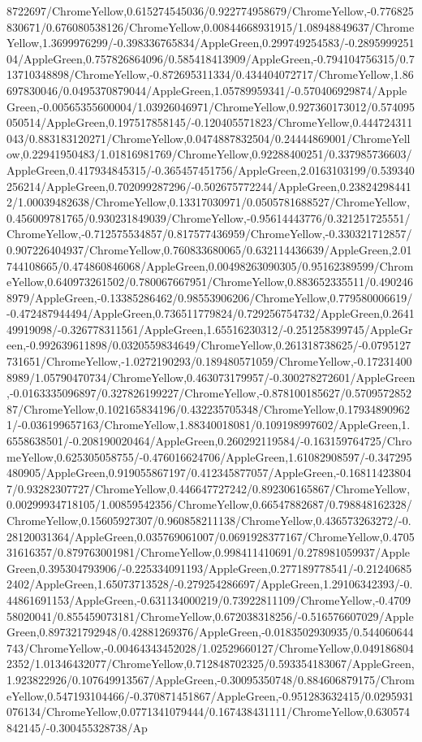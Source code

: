 {\begin{tikzternal}
8722697/ChromeYellow,0.615274545036/0.922774958679/ChromeYellow,-0.776825830671/0.676080538126/ChromeYellow,0.00844668931915/1.08948849637/ChromeYellow,1.3699976299/-0.398336765834/AppleGreen,0.299749254583/-0.289599925104/AppleGreen,0.757826864096/0.585418413909/AppleGreen,-0.794104756315/0.713710348898/ChromeYellow,-0.872695311334/0.434404072717/ChromeYellow,1.86697830046/0.0495370879044/AppleGreen,1.05789959341/-0.570406929874/AppleGreen,-0.00565355600004/1.03926046971/ChromeYellow,0.927360173012/0.574095050514/AppleGreen,0.197517858145/-0.120405571823/ChromeYellow,0.444724311043/0.883183120271/ChromeYellow,0.0474887832504/0.24444869001/ChromeYellow,0.22941950483/1.01816981769/ChromeYellow,0.92288400251/0.337985736603/AppleGreen,0.417934845315/-0.365457451756/AppleGreen,2.0163103199/0.539340256214/AppleGreen,0.702099287296/-0.502675772244/AppleGreen,0.238242984412/1.00039482638/ChromeYellow,0.13317030971/0.0505781688527/ChromeYellow,0.456009781765/0.930231849039/ChromeYellow,-0.95614443776/0.321251725551/ChromeYellow,-0.712575534857/0.817577436959/ChromeYellow,-0.330321712857/0.907226404937/ChromeYellow,0.760833680065/0.632114436639/AppleGreen,2.01744108665/0.474860846068/AppleGreen,0.00498263090305/0.95162389599/ChromeYellow,0.640973261502/0.780067667951/ChromeYellow,0.883652335511/0.4902468979/AppleGreen,-0.13385286462/0.98553906206/ChromeYellow,0.779580006619/-0.472487944494/AppleGreen,0.736511779824/0.729256754732/AppleGreen,0.264149919098/-0.326778311561/AppleGreen,1.65516230312/-0.251258399745/AppleGreen,-0.992639611898/0.0320559834649/ChromeYellow,0.261318738625/-0.0795127731651/ChromeYellow,-1.0272190293/0.189480571059/ChromeYellow,-0.172314008989/1.05790470734/ChromeYellow,0.463073179957/-0.300278272601/AppleGreen,-0.0163335096897/0.327826199227/ChromeYellow,-0.878100185627/0.570957285287/ChromeYellow,0.102165834196/0.432235705348/ChromeYellow,0.179348909621/-0.036199657163/ChromeYellow,1.88340018081/0.109198997602/AppleGreen,1.6558638501/-0.208190020464/AppleGreen,0.260292119584/-0.163159764725/ChromeYellow,0.625305058755/-0.476016624706/AppleGreen,1.61082908597/-0.347295480905/AppleGreen,0.919055867197/0.412345877057/AppleGreen,-0.168114238047/0.93282307727/ChromeYellow,0.446647727242/0.892306165867/ChromeYellow,0.00299934718105/1.00859542356/ChromeYellow,0.66547882687/0.798848162328/ChromeYellow,0.15605927307/0.960858211138/ChromeYellow,0.436573263272/-0.28120031364/AppleGreen,0.035769061007/0.0691928377167/ChromeYellow,0.470531616357/0.879763001981/ChromeYellow,0.998411410691/0.278981059937/AppleGreen,0.395304793906/-0.225334091193/AppleGreen,0.277189778541/-0.212406852402/AppleGreen,1.65073713528/-0.279254286697/AppleGreen,1.29106342393/-0.44861691153/AppleGreen,-0.631134000219/0.73922811109/ChromeYellow,-0.470958020041/0.855459073181/ChromeYellow,0.672038318256/-0.516576607029/AppleGreen,0.897321792948/0.42881269376/AppleGreen,-0.0183502930935/0.544060644743/ChromeYellow,-0.00464343452028/1.02529660127/ChromeYellow,0.0491868042352/1.01346432077/ChromeYellow,0.712848702325/0.593354183067/AppleGreen,1.923822926/0.107649913567/AppleGreen,-0.30095350748/0.884606879175/ChromeYellow,0.547193104466/-0.370871451867/AppleGreen,-0.951283632415/0.0295931076134/ChromeYellow,0.0771341079444/0.167438431111/ChromeYellow,0.630574842145/-0.300455328738/Ap
\end{tikzternal}}
